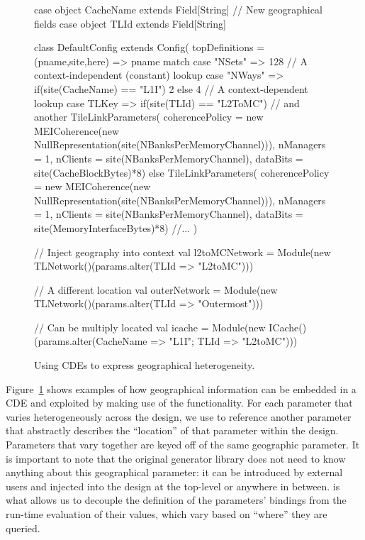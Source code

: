 \begin{figure}
\centering
\begin{scala}
case object CacheName extends Field[String] // New geographical fields
case object TLId extends Field[String]

class DefaultConfig extends Config(
  topDefinitions = { (pname,site,here) =>
    pname match {
      case "NSets" => 128 // A context-independent (constant) lookup
      case "NWays" => if(site(CacheName) == "L1I") 2 else 4 // A context-dependent lookup
      case TLKey => if(site(TLId) == "L2ToMC") {            // and another
          TileLinkParameters(
            coherencePolicy = new MEICoherence(new NullRepresentation(site(NBanksPerMemoryChannel))),
            nManagers = 1,
            nClients = site(NBanksPerMemoryChannel),
            dataBits = site(CacheBlockBytes)*8)
        } else {
          TileLinkParameters(
            coherencePolicy = new MEICoherence(new NullRepresentation(site(NBanksPerMemoryChannel))),
            nManagers = 1,
            nClients = site(NBanksPerMemoryChannel),
            dataBits = site(MemoryInterfaceBytes)*8)
        }
      //...
    }
  }
)

// Inject geography into context
val l2toMCNetwork = Module(new TLNetwork()(params.alter({TLId => "L2toMC"})))

// A different location
val outerNetwork = Module(new TLNetwork()(params.alter({TLId => "Outermost"})))

// Can be multiply located
val icache = Module(new ICache()(params.alter({CacheName => "L1I"; TLId => "L2toMC"})))

\end{scala} 
\caption{Using CDEs to express geographical heterogeneity.}
\label{fig:geo}
\end{figure}

Figure~\ref{fig:geo} shows examples of how geographical information can be embedded in a CDE
and exploited by making use of the  functionality.
For each parameter that varies heterogeneously across the design, we use 
to reference another parameter that abstractly describes the ``location'' of that parameter within the design.
Parameters that vary together are keyed off of the same geographic parameter.
It is important to note that the original generator library does not need to know anything about
this geographical parameter:
it can be introduced by external users and injected into the design at the top-level or anywhere in between.
 is what allows us to decouple the definition of the parameters' bindings from the run-time evaluation of their values,
which vary based on ``where'' they are queried.

